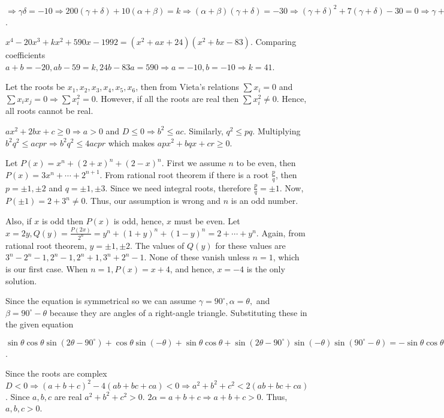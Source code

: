   $\Rightarrow \gamma\delta = -10 \Rightarrow 200(\gamma + \delta) + 10(\alpha + \beta) = k \Rightarrow
  (\alpha + \beta)(\gamma + \delta) = -30 \Rightarrow (\gamma + \delta)^2 + 7(\gamma + \delta) - 30 = 0
  \Rightarrow \gamma + \delta = -10, 3 \Rightarrow \alpha + \beta = 3, -10\Rightarrow k = -1970, 500$.
\item $x^4 - 20x^3 + kx^2 + 590x - 1992 = (x^2 + ax + 24)(x^2 + bx - 83)$. Comparing coefficients
  $a + b = -20, ab - 59 = k, 24b - 83a = 590 \Rightarrow a = -10, b = -10 \Rightarrow k = 41$.
\item Let the roots be $x_1, x_2, x_3, x_4, x_5, x_6$, then from Vieta's relations $\sum x_i = 0$ and $\sum
  x_ix_j = 0 \Rightarrow \sum x_i^2 = 0$. However, if all the roots are real then $\sum x_i^2\neq 0$. Hence,
  all roots cannot be real.
\item $ax^2 + 2bx + c\geq 0 \Rightarrow a > 0$ and $D\leq 0 \Rightarrow b^2\leq ac$. Similarly, $q^2\leq
  pq$. Multiplying $b^2q^2\leq acpr \Rightarrow b^2q^2\leq 4acpr$ which makes $apx^2 + bqx + cr\geq 0$.
\item Let $P(x) = x^n + (2 + x)^n + (2 - x)^n$. First we assume $n$ to be even, then $P(x) = 3 x^n + \cdots
  + 2^{n + 1}$. From rational root theorem if there is a root $\frac{p}{q}$, then $p = \pm1, \pm2$ and $q =
  \pm1, \pm3$. Since we need integral roots, therefore $\frac{p}{q} = \pm1$. Now, $P(\pm1) = 2 + 3^n\neq
  0$. Thus, our assumption is wrong and $n$ is an odd number.

  Also, if $x$ is odd then $P(x)$ is odd, hence, $x$ must be even. Let $x = 2y, Q(y) = \frac{P(2x)}{2^n} =
  y^n + (1 + y)^n + (1 - y)^n = 2 + \cdots + y^n$. Again, from rational root theorem, $y = \pm1, \pm2$. The
  values of $Q(y)$ for these values are $3^n - 2^n - 1, 2^n - 1, 2^n + 1, 3^n + 2^n - 1$. None of these
  vanish unless $n = 1$, which is our first case. When $n = 1, P(x) = x + 4$, and hence, $x = -4$ is the
  only solution.
\item Since the equation is symmetrical so we can assume $\gamma = 90^\circ, \alpha = \theta,$ and $\beta =
  90^\circ - \theta$ because they are angles of a right-angle triangle. Substituting these in the given
  equation

  $\sin\theta\cos\theta\sin(2\theta - 90^\circ) + \cos\theta\sin(-\theta) + \sin\theta\cos\theta +
  \sin(2\theta - 90^\circ)\sin(-\theta)\sin(90^\circ - \theta) = -\sin\theta\cos\theta\cos2\theta -
  \sin\theta\cos\theta + \sin\theta\cos\theta + \cos2\theta\sin\theta\cos\theta = 0$.
\item Since the roots are complex $D < 0 \Rightarrow (a + b + c)^2 - 4(ab + bc + ca) < 0 \Rightarrow a^2 +
  b^2 + c^2 < 2(ab + bc + ca)$. Since $a, b, c$ are real $a^2 + b^2 + c^2 > 0$. $2\alpha = a + b +
  c\Rightarrow a + b + c > 0$. Thus, $a, b, c > 0$.


